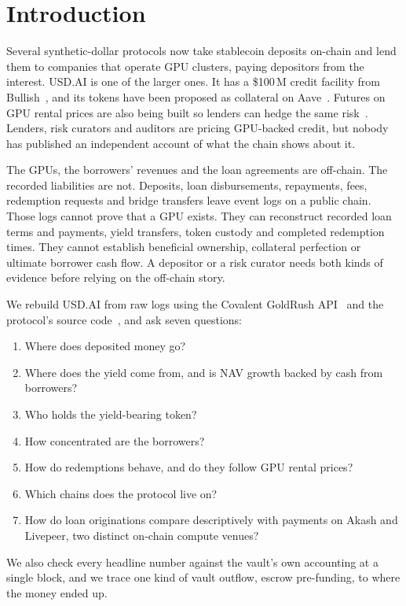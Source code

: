 \section{Introduction}\label{sec:intro}

Several synthetic-dollar protocols now take stablecoin deposits on-chain and lend them to companies that operate GPU clusters, paying depositors from the interest. USD.AI is one of the larger ones. It has a \$100\,M credit facility from Bullish~\cite{bullish2025}, and its tokens have been proposed as collateral on Aave~\cite{aavearfc}. Futures on GPU rental prices are also being built so lenders can hedge the same risk~\cite{architect2026}. Lenders, risk curators and auditors are pricing GPU-backed credit, but nobody has published an independent account of what the chain shows about it.

The GPUs, the borrowers' revenues and the loan agreements are off-chain. The recorded liabilities are not. Deposits, loan disbursements, repayments, fees, redemption requests and bridge transfers leave event logs on a public chain. Those logs cannot prove that a GPU exists. They can reconstruct recorded loan terms and payments, yield transfers, token custody and completed redemption times. They cannot establish beneficial ownership, collateral perfection or ultimate borrower cash flow. A depositor or a risk curator needs both kinds of evidence before relying on the off-chain story.

We rebuild USD.AI from raw logs using the Covalent GoldRush API~\cite{goldrush} and the protocol's source code~\cite{usdaisrc}, and ask seven questions:
\begin{enumerate}
\item[RQ1] Where does deposited money go?
\item[RQ2] Where does the yield come from, and is NAV growth backed by cash from borrowers?
\item[RQ3] Who holds the yield-bearing token?
\item[RQ4] How concentrated are the borrowers?
\item[RQ5] How do redemptions behave, and do they follow GPU rental prices?
\item[RQ6] Which chains does the protocol live on?
\item[RQ7] How do loan originations compare descriptively with payments on Akash and Livepeer, two distinct on-chain compute venues?
\end{enumerate}
We also check every headline number against the vault's own accounting at a single block, and we trace one kind of vault outflow, escrow pre-funding, to where the money ended up.

